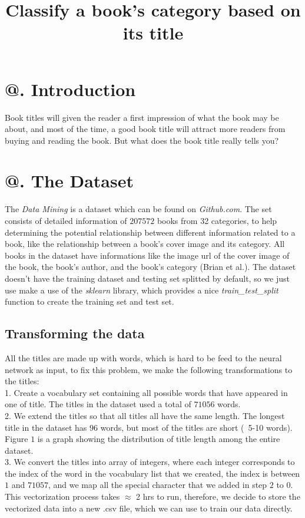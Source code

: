 \documentclass[jou,apacite, 10px]{apa6}
\title{Classify a book's category based on its title}
\makeatletter
\newcommand*{\rom}[1]{\expandafter\@slowromancap\romannumeral #1@}
\makeatother
\begin{document}
\maketitle    
                        
\section{\rom{1}. Introduction}
Book titles will given the reader a first impression of what the book may be about, and most of the time, a good book title will attract more readers from buying and reading the book. But what does the book title really tells you? 

\section{\rom{2}. The Dataset}
The \textit{Data Mining} is a dataset which can be found on \textit{Github.com}. The set consists of detailed information of $207572$  books from 32 categories, to help determining the potential relationship between different information related to a book, like the relationship between a book's cover image and its category. All books in the dataset have informations like the image url of the cover image of the book, the book's author, and the book's category (Brian et al.). The dataset doesn't have the training dataset and testing set splitted by default, so we just use make a use of the \textit{sklearn} library, which provides a nice \textit{train\_test\_split} function to create the training set and test set.

\subsection{Transforming the data}
All the titles are made up with words, which is hard to be feed to the neural network as input, to fix this problem, we make the following transformations to the titles:\\
1. Create a vocabulary set containing all possible words that have appeared in one of title. The titles in the dataset used a total of $71056$ words.\\
2. We extend the titles so that all titles all have the same length. The longest title in the dataset has $96$ words, but most of the titles are short (~5-10 words). Figure $1$ is a graph showing the distribution of title length among the entire dataset.\\
3. We convert the titles into array of integers, where each integer corresponds to the index of the word in the vocabulary list that we created, the index is between $1$ and $71057$, and we map all the special character that we added in step $2$ to $0$.\\
This vectorization process takes $\approx$ 2 hrs to run, therefore, we decide to store the vectorized data into a new .csv file, which we can use to train our data directly.
\end{document}
